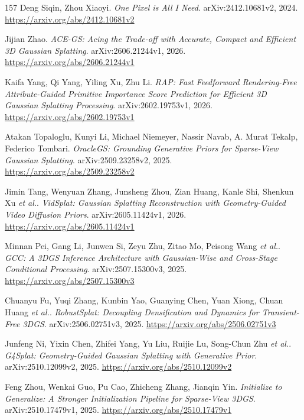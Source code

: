 \documentclass[11pt,a4paper]{article}
\begin{document}
\begin{thebibliography}{157}
Deng Siqin, Zhou Xiaoyi.
\newblock \emph{One Pixel is All I Need}.
\newblock arXiv:2412.10681v2, 2024.
\newblock \url{https://arxiv.org/abs/2412.10681v2}

Jijian Zhao.
\newblock \emph{ACE-GS: Acing the Trade-off with Accurate, Compact and Efficient 3D Gaussian Splatting}.
\newblock arXiv:2606.21244v1, 2026.
\newblock \url{https://arxiv.org/abs/2606.21244v1}

Kaifa Yang, Qi Yang, Yiling Xu, Zhu Li.
\newblock \emph{RAP: Fast Feedforward Rendering-Free Attribute-Guided Primitive Importance Score Prediction for Efficient 3D Gaussian Splatting Processing}.
\newblock arXiv:2602.19753v1, 2026.
\newblock \url{https://arxiv.org/abs/2602.19753v1}

Atakan Topaloglu, Kunyi Li, Michael Niemeyer, Nassir Navab, A. Murat Tekalp, Federico Tombari.
\newblock \emph{OracleGS: Grounding Generative Priors for Sparse-View Gaussian Splatting}.
\newblock arXiv:2509.23258v2, 2025.
\newblock \url{https://arxiv.org/abs/2509.23258v2}

Jimin Tang, Wenyuan Zhang, Junsheng Zhou, Zian Huang, Kanle Shi, Shenkun Xu \emph{et al.}.
\newblock \emph{VidSplat: Gaussian Splatting Reconstruction with Geometry-Guided Video Diffusion Priors}.
\newblock arXiv:2605.11424v1, 2026.
\newblock \url{https://arxiv.org/abs/2605.11424v1}

Minnan Pei, Gang Li, Junwen Si, Zeyu Zhu, Zitao Mo, Peisong Wang \emph{et al.}.
\newblock \emph{GCC: A 3DGS Inference Architecture with Gaussian-Wise and Cross-Stage Conditional Processing}.
\newblock arXiv:2507.15300v3, 2025.
\newblock \url{https://arxiv.org/abs/2507.15300v3}

Chuanyu Fu, Yuqi Zhang, Kunbin Yao, Guanying Chen, Yuan Xiong, Chuan Huang \emph{et al.}.
\newblock \emph{RobustSplat: Decoupling Densification and Dynamics for Transient-Free 3DGS}.
\newblock arXiv:2506.02751v3, 2025.
\newblock \url{https://arxiv.org/abs/2506.02751v3}

Junfeng Ni, Yixin Chen, Zhifei Yang, Yu Liu, Ruijie Lu, Song-Chun Zhu \emph{et al.}.
\newblock \emph{G4Splat: Geometry-Guided Gaussian Splatting with Generative Prior}.
\newblock arXiv:2510.12099v2, 2025.
\newblock \url{https://arxiv.org/abs/2510.12099v2}

Feng Zhou, Wenkai Guo, Pu Cao, Zhicheng Zhang, Jianqin Yin.
\newblock \emph{Initialize to Generalize: A Stronger Initialization Pipeline for Sparse-View 3DGS}.
\newblock arXiv:2510.17479v1, 2025.
\newblock \url{https://arxiv.org/abs/2510.17479v1}


\end{thebibliography}
\end{document}
